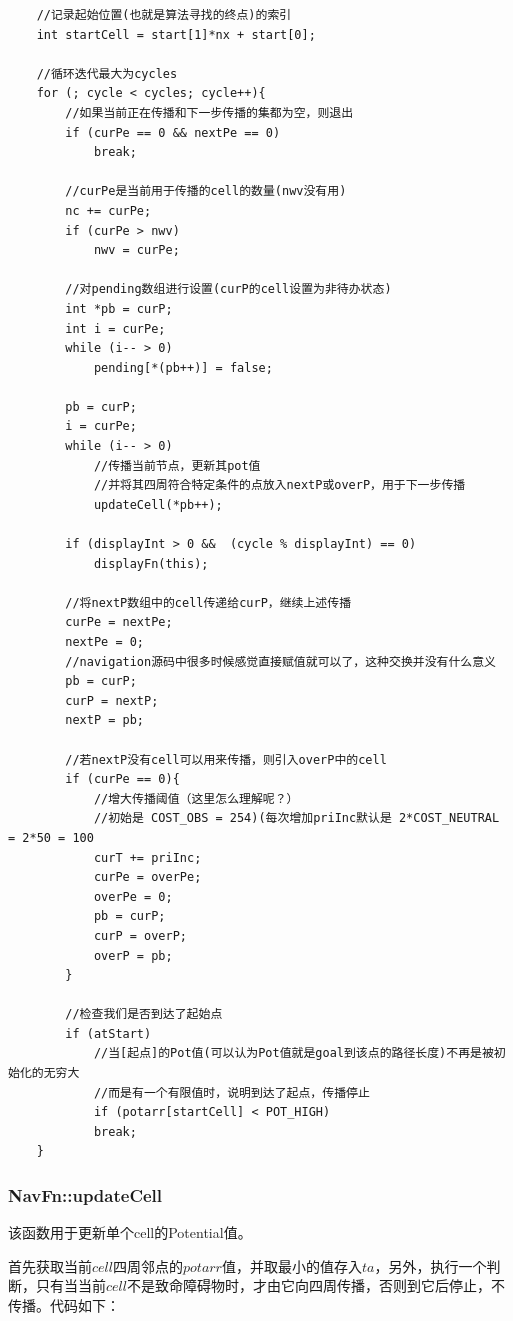 \documentclass[9pt, oneside]{book}
\begin{document}
\small
\begin{verbatim}
    //记录起始位置(也就是算法寻找的终点)的索引
    int startCell = start[1]*nx + start[0];

    //循环迭代最大为cycles
    for (; cycle < cycles; cycle++){
        //如果当前正在传播和下一步传播的集都为空，则退出
        if (curPe == 0 && nextPe == 0)
            break;

        //curPe是当前用于传播的cell的数量(nwv没有用)
        nc += curPe;
        if (curPe > nwv)
            nwv = curPe;

        //对pending数组进行设置(curP的cell设置为非待办状态)
        int *pb = curP;
        int i = curPe;			
        while (i-- > 0)
            pending[*(pb++)] = false;

        pb = curP; 
        i = curPe;
        while (i-- > 0)
            //传播当前节点，更新其pot值
            //并将其四周符合特定条件的点放入nextP或overP，用于下一步传播
            updateCell(*pb++);

        if (displayInt > 0 &&  (cycle % displayInt) == 0)
            displayFn(this);

        //将nextP数组中的cell传递给curP，继续上述传播
        curPe = nextPe;
        nextPe = 0;
        //navigation源码中很多时候感觉直接赋值就可以了，这种交换并没有什么意义
        pb = curP;		
        curP = nextP;
        nextP = pb;

        //若nextP没有cell可以用来传播，则引入overP中的cell
        if (curPe == 0){
            //增大传播阈值（这里怎么理解呢？）
            //初始是 COST_OBS = 254)(每次增加priInc默认是 2*COST_NEUTRAL = 2*50 = 100
            curT += priInc;
            curPe = overPe;
            overPe = 0;
            pb = curP;
            curP = overP;
            overP = pb;
        }

        //检查我们是否到达了起始点
        if (atStart)
            //当[起点]的Pot值(可以认为Pot值就是goal到该点的路径长度)不再是被初始化的无穷大
            //而是有一个有限值时，说明到达了起点，传播停止
            if (potarr[startCell] < POT_HIGH)
            break;
    }
\end{verbatim}
\normalsize

\subsubsection{NavFn::updateCell}

该函数用于更新单个cell的Potential值。

首先获取当前$cell$四周邻点的$potarr$值，并取最小的值存入$ta$，另外，执行一个判断，只有当当前$cell$不是致命障碍物时，才由它向四周传播，否则到它后停止，不传播。代码如下：
\end{document}
